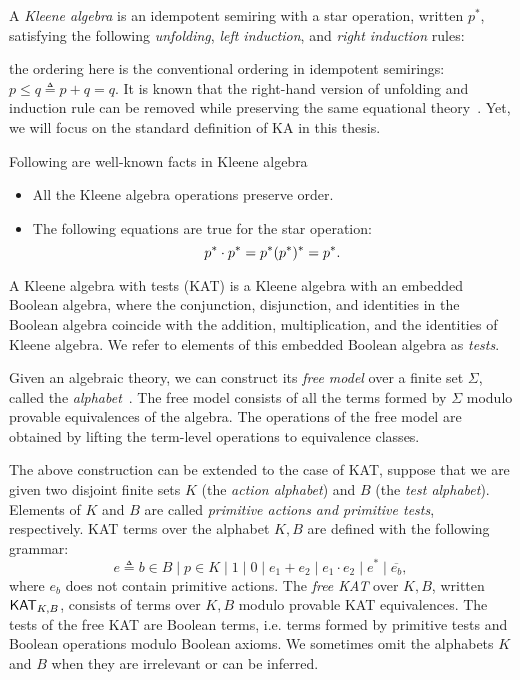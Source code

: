 A \emph{Kleene algebra} is an idempotent semiring with a star operation, written
$p^*$, satisfying the following \emph{unfolding}, \emph{left induction},
and \emph{right induction} rules:
the ordering here is the conventional ordering in idempotent semirings: \(p  \leq  q  \triangleq  p + q = q.\)
It is known that the right-hand version of unfolding and induction rule 
can be removed while preserving the same equational theory~\cite{Kozen_Silva_2020}.
Yet, we will focus on the standard definition of KA in this thesis.
\begin{lemma}\label{the: well known fact about KA}
    Following are well-known facts in Kleene algebra
    \begin{itemize}
        \item All the Kleene algebra operations preserve order.
        \item The following equations are true for the star operation:
              \[ p^*  \cdot  p^* = p^* \\ (p^*)^* = p^*.\]
    \end{itemize}
\end{lemma}

A Kleene algebra with tests (KAT) is a Kleene algebra with an embedded Boolean algebra,
where the conjunction, disjunction, and identities in the Boolean algebra coincide with 
the addition, multiplication, and the identities of Kleene algebra.  
We refer to elements of this embedded Boolean algebra as \emph{tests}.

Given an algebraic theory, we can construct its \emph{free model} 
over a finite set \( Σ \), 
called the \emph{alphabet}~\cite{burrisCourseUniversalAlgebra1981}.  
The free model consists of all the terms formed by \( Σ \) modulo  
provable equivalences of the algebra. The operations of the free model are obtained 
by lifting the term-level operations to equivalence classes.

The above construction can be extended to the case of KAT, 
suppose that we are given two disjoint finite sets $K$ (the
\emph{action alphabet}) and $B$ (the \emph{test alphabet}).  Elements of $K$ and
$B$ are called \emph{primitive actions and primitive tests}, respectively. 
KAT terms over the alphabet \(K, B\) are defined with the following grammar:
\[e  ≜  b  ∈  B  ∣  p  ∈  K  ∣  1  ∣  0  ∣  e_1 + e_2  ∣  e_1  ⋅  e_2  ∣  e^*  ∣  \overline{e_b},\]
where \(e_b\) does not contain primitive actions.
The \emph{free KAT} over \(K, B\), written $\mathsf{KAT}_{K,B}$, 
consists of terms over \(K, B\) modulo provable KAT equivalences.  
The tests of the free KAT are Boolean terms, i.e. terms formed by primitive tests and Boolean operations modulo Boolean axioms.
We sometimes omit the alphabets \(K\) and \(B\) when they
are irrelevant or can be inferred.

